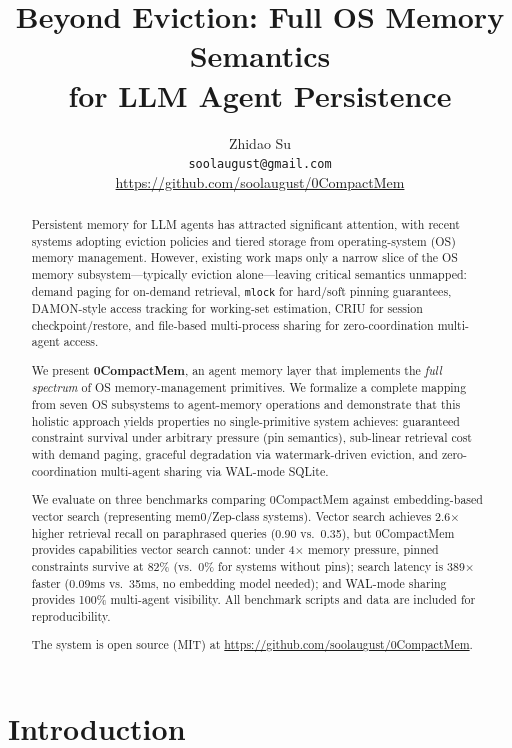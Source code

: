 \documentclass[10pt,twocolumn]{article}
\title{\textbf{Beyond Eviction: Full OS Memory Semantics\\for LLM Agent Persistence}}
\author{
  Zhidao Su \\
  \texttt{soolaugust@gmail.com} \\
  \url{https://github.com/soolaugust/0CompactMem}
}
\date{}
\begin{document}
\maketitle

\begin{abstract}
Persistent memory for LLM agents has attracted significant attention, with recent systems adopting eviction policies and tiered storage from operating-system (OS) memory management. However, existing work maps only a narrow slice of the OS memory subsystem---typically eviction alone---leaving critical semantics unmapped: demand paging for on-demand retrieval, \texttt{mlock} for hard/soft pinning guarantees, DAMON-style access tracking for working-set estimation, CRIU for session checkpoint/restore, and file-based multi-process sharing for zero-coordination multi-agent access.

We present \textbf{0CompactMem}, an agent memory layer that implements the \emph{full spectrum} of OS memory-management primitives. We formalize a complete mapping from seven OS subsystems to agent-memory operations and demonstrate that this holistic approach yields properties no single-primitive system achieves: guaranteed constraint survival under arbitrary pressure (pin semantics), sub-linear retrieval cost with demand paging, graceful degradation via watermark-driven eviction, and zero-coordination multi-agent sharing via WAL-mode SQLite.

We evaluate on three benchmarks comparing 0CompactMem against embedding-based vector search (representing mem0/Zep-class systems). Vector search achieves 2.6$\times$ higher retrieval recall on paraphrased queries (0.90 vs.\ 0.35), but 0CompactMem provides capabilities vector search cannot: under 4$\times$ memory pressure, pinned constraints survive at 82\% (vs.\ 0\% for systems without pins); search latency is 389$\times$ faster (0.09ms vs.\ 35ms, no embedding model needed); and WAL-mode sharing provides 100\% multi-agent visibility. All benchmark scripts and data are included for reproducibility.

The system is open source (MIT) at \url{https://github.com/soolaugust/0CompactMem}.
\end{abstract}

\section{Introduction}
\label{sec:intro}
\end{document}
